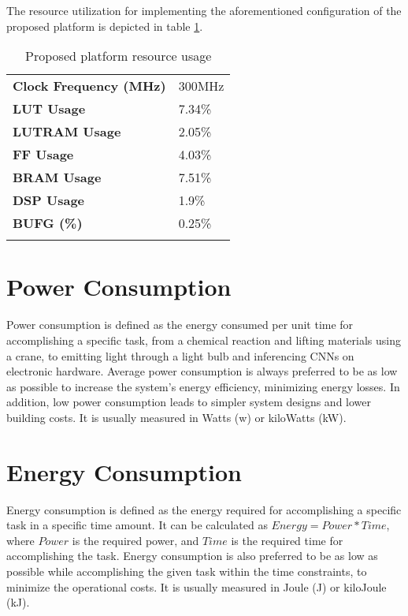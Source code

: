 The resource utilization for implementing the aforementioned configuration of the proposed platform is depicted in table \ref{tab:Proposed-platform-resource-usage}.

\begin{table}[H]
	\caption{Proposed platform resource usage}
	\label{tab:Proposed-platform-resource-usage}
	\centering
	\begin{tabular}{ll}
		\toprule
		\textbf{Clock Frequency (MHz)} & 300MHz\\
		\textbf{LUT Usage} & 7.34\%\\
		\textbf{LUTRAM Usage} & 2.05\%\\
		\textbf{FF Usage} & 4.03\%\\
		\textbf{BRAM Usage} & 7.51\%\\
		\textbf{DSP Usage} & 1.9\%\\
		\textbf{BUFG (\%)} & 0.25\%\\
		\bottomrule\\
	\end{tabular}
\end{table}

\section{Power Consumption}
Power consumption is defined as the energy consumed per unit time for accomplishing a specific task, from a chemical reaction and lifting materials using a crane, to emitting light through a light bulb and inferencing CNNs on electronic hardware. Average power consumption is always preferred to be as low as possible to increase the system's energy efficiency, minimizing energy losses. In addition, low power consumption leads to simpler system designs and lower building costs. It is usually measured in Watts (w) or kiloWatts (kW).

\section{Energy Consumption}
Energy consumption is defined as the energy required for accomplishing a specific task in a specific time amount. It can be calculated as $Energy = Power * Time$, where $Power$ is the required power, and $Time$ is the required time for accomplishing the task. Energy consumption is also preferred to be as low as possible while accomplishing the given task within the time constraints, to minimize the operational costs. It is usually measured in Joule (J) or kiloJoule (kJ).

